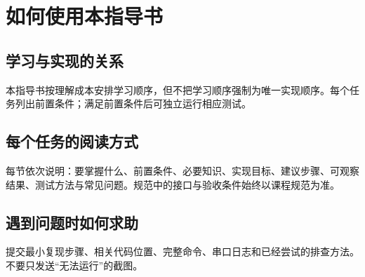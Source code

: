 \chapter{如何使用本指导书}

\section{学习与实现的关系}
本指导书按理解成本安排学习顺序，但不把学习顺序强制为唯一实现顺序。每个任务列出前置条件；满足前置条件后可独立运行相应测试。

\section{每个任务的阅读方式}
每节依次说明：要掌握什么、前置条件、必要知识、实现目标、建议步骤、可观察结果、测试方法与常见问题。规范中的接口与验收条件始终以课程规范为准。

\section{遇到问题时如何求助}
提交最小复现步骤、相关代码位置、完整命令、串口日志和已经尝试的排查方法。不要只发送“无法运行”的截图。
